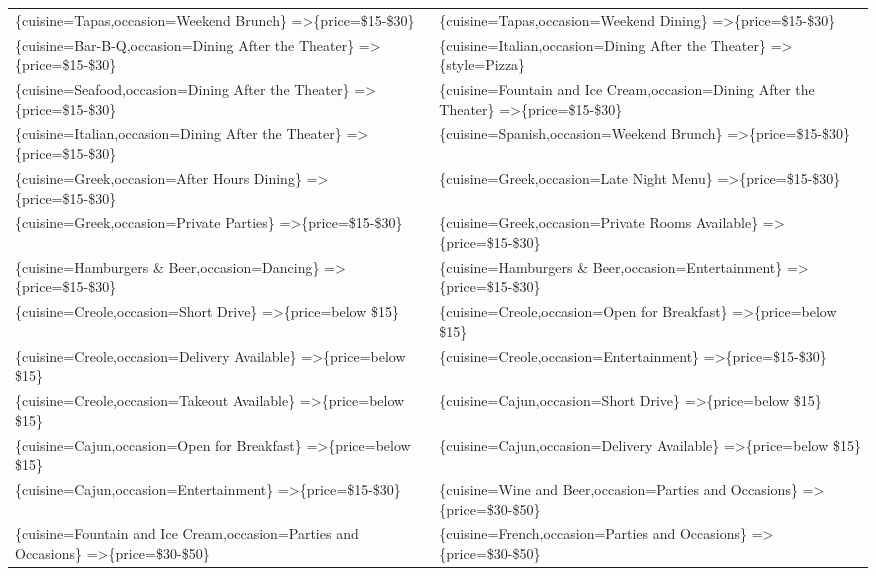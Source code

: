 \documentclass[letterpaper,10pt]{article}
\begin{document}
\begin{appendices}
\begin{table}[h]
\begin{adjustbox}{max width=\textwidth}
\begin{tabular}{ll}
\{cuisine=Tapas,occasion=Weekend Brunch\} =\textgreater \{price=\$15-\$30\} & \{cuisine=Tapas,occasion=Weekend Dining\} =\textgreater \{price=\$15-\$30\} \\ 
\{cuisine=Bar-B-Q,occasion=Dining After the Theater\} =\textgreater \{price=\$15-\$30\} & \{cuisine=Italian,occasion=Dining After the Theater\} =\textgreater \{style=Pizza\} \\ 
\{cuisine=Seafood,occasion=Dining After the Theater\} =\textgreater \{price=\$15-\$30\} & \{cuisine=Fountain and Ice Cream,occasion=Dining After the Theater\} =\textgreater \{price=\$15-\$30\} \\ 
\{cuisine=Italian,occasion=Dining After the Theater\} =\textgreater \{price=\$15-\$30\} & \{cuisine=Spanish,occasion=Weekend Brunch\} =\textgreater \{price=\$15-\$30\} \\ 
\{cuisine=Greek,occasion=After Hours Dining\} =\textgreater \{price=\$15-\$30\} & \{cuisine=Greek,occasion=Late Night Menu\} =\textgreater \{price=\$15-\$30\} \\ 
\{cuisine=Greek,occasion=Private Parties\} =\textgreater \{price=\$15-\$30\} & \{cuisine=Greek,occasion=Private Rooms Available\} =\textgreater \{price=\$15-\$30\} \\ 
\{cuisine=Hamburgers \& Beer,occasion=Dancing\} =\textgreater \{price=\$15-\$30\} & \{cuisine=Hamburgers \& Beer,occasion=Entertainment\} =\textgreater \{price=\$15-\$30\} \\ 
\{cuisine=Creole,occasion=Short Drive\} =\textgreater \{price=below \$15\} & \{cuisine=Creole,occasion=Open for Breakfast\} =\textgreater \{price=below \$15\} \\ 
\{cuisine=Creole,occasion=Delivery Available\} =\textgreater \{price=below \$15\} & \{cuisine=Creole,occasion=Entertainment\} =\textgreater \{price=\$15-\$30\} \\ 
\{cuisine=Creole,occasion=Takeout Available\} =\textgreater \{price=below \$15\} & \{cuisine=Cajun,occasion=Short Drive\} =\textgreater \{price=below \$15\} \\ 
\{cuisine=Cajun,occasion=Open for Breakfast\} =\textgreater \{price=below \$15\} & \{cuisine=Cajun,occasion=Delivery Available\} =\textgreater \{price=below \$15\} \\ 
\{cuisine=Cajun,occasion=Entertainment\} =\textgreater \{price=\$15-\$30\} & \{cuisine=Wine and Beer,occasion=Parties and Occasions\} =\textgreater \{price=\$30-\$50\} \\ 
\{cuisine=Fountain and Ice Cream,occasion=Parties and Occasions\} =\textgreater \{price=\$30-\$50\} & \{cuisine=French,occasion=Parties and Occasions\} =\textgreater \{price=\$30-\$50\} \\ 

\end{tabular}
\end{adjustbox}
\end{table}
\end{appendices}
\end{document}
